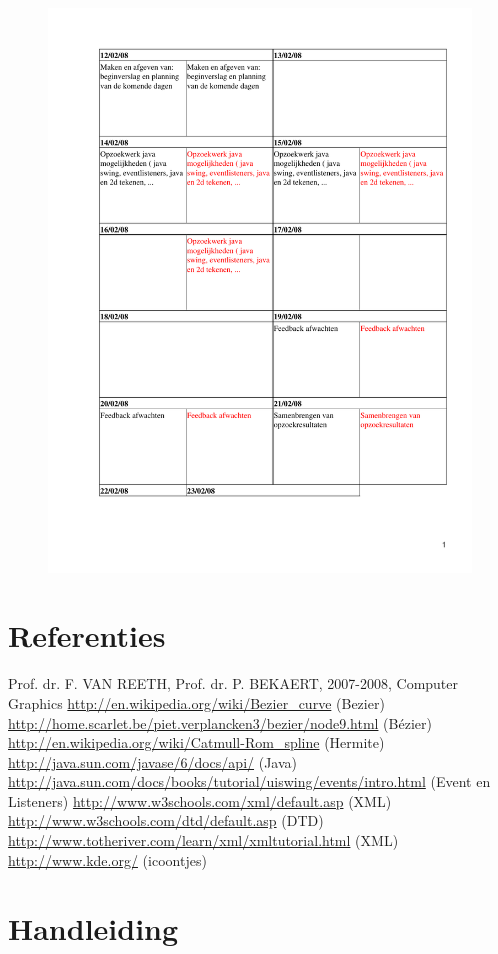 \documentclass[a4paper,11pt,oneside, titlepage]{article}
\begin{document}
\begin{figure}[htbp]
\centering
\includegraphics[scale=0.8, page=9]{./planning.pdf}
\end{figure}\newpage
\section{Referenties}
Prof. dr. F. VAN REETH, Prof. dr. P. BEKAERT, 2007-2008, Computer Graphics\newline
\url{http://en.wikipedia.org/wiki/Bezier\_curve} (Bezier)\newline
\url{http://home.scarlet.be/piet.verplancken3/bezier/node9.html} (B\'ezier)\newline
\url{http://en.wikipedia.org/wiki/Catmull-Rom\_spline} (Hermite)\newline
\url{http://java.sun.com/javase/6/docs/api/} (Java)\newline
\url{http://java.sun.com/docs/books/tutorial/uiswing/events/intro.html} (Event en Listeners)\newline
\url{http://www.w3schools.com/xml/default.asp} (XML)\newline
\url{http://www.w3schools.com/dtd/default.asp} (DTD)\newline
\url{http://www.totheriver.com/learn/xml/xmltutorial.html} (XML)\newline
\url{http://www.kde.org/} (icoontjes)\newline
\section{Handleiding}
\newpage
\end{document}
